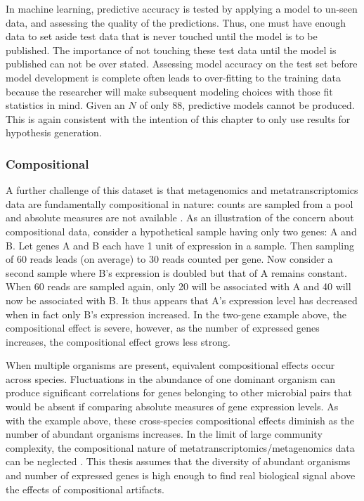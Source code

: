 In machine learning, predictive accuracy is tested by applying a model to un-seen data, and assessing the quality of the predictions.
Thus, one must have enough data to set aside test data that is never touched until the model is to be published.
The importance of not touching these test data until the model is published can not be over stated.
Assessing model accuracy on the test set before model development is complete often leads to over-fitting to the training data because the researcher will make subsequent modeling choices with those fit statistics in mind.
Given an $N$ of only 88, predictive models cannot be produced.
This is again consistent with the intention of this chapter to only use results for hypothesis generation.

\subsubsection{Compositional}
A further challenge of this dataset is that metagenomics and metatranscriptomics data are fundamentally compositional in nature: counts are sampled from a pool and absolute measures are not available \cite{tsilimigras2016, aitchison1982}.
As an illustration of the concern about compositional data, consider a hypothetical sample having only two genes: A and B.
Let genes A and B each have 1 unit of expression in a sample.
Then sampling of 60 reads leads (on average) to 30 reads counted per gene.
Now consider a second sample where B's expression is doubled but that of A remains constant.  When 60 reads are sampled again, only 20 will be associated with A and 40 will now be associated with B.
It thus appears that A's expression level has decreased when in fact only B's expression increased.
In the two-gene example above, the compositional effect is severe, however, as the number of expressed genes increases, the compositional effect grows less strong.

When multiple organisms are present, equivalent compositional effects occur across species.
Fluctuations in the abundance of one dominant organism can produce significant correlations for genes belonging to other microbial pairs that would be absent if comparing absolute measures of gene expression levels.
As with the example above, these cross-species compositional effects diminish as the number of abundant organisms increases.
In the limit of large community complexity, the compositional nature of metatranscriptomics/metagenomics data can be neglected \cite{tsilimigras2016}.
This thesis assumes that the diversity of abundant organisms and number of expressed genes is high enough to find real biological signal above the effects of compositional artifacts.

